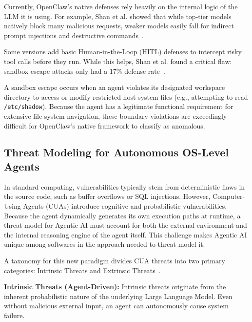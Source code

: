 \documentclass[a4paper]{report}
\begin{document}
Currently, OpenClaw's native defenses rely heavily on the internal logic of the LLM it is using. For example, Shan et al. showed that while top-tier models natively block many malicious requests, weaker models easily fall for indirect prompt injections and destructive commands~\cite{shan2025dont}.

Some versions add basic Human-in-the-Loop (HITL) defenses to intercept risky tool calls before they run. While this helps, Shan et al. found a critical flaw: sandbox escape attacks only had a 17\% defense rate~\cite{shan2025dont}.

A sandbox escape occurs when an agent violates its designated workspace directory to access or modify restricted host system files (e.g., attempting to read \texttt{/etc/shadow}). Because the agent has a legitimate functional requirement for extensive file system navigation, these boundary violations are exceedingly difficult for OpenClaw's native framework to classify as anomalous.

\subsection{Threat Modeling for Autonomous OS-Level Agents}

In standard computing, vulnerabilities typically stem from deterministic flaws in the source code, such as buffer overflows or SQL injections. However, Computer-Using Agents (CUAs) introduce cognitive and probabilistic vulnerabilities. Because the agent dynamically generates its own execution paths at runtime, a threat model for Agentic AI must account for both the external environment and the internal reasoning engine of the agent itself. This challenge makes Agentic AI unique among softwares in the approach needed to threat model it.

A taxonomy for this new paradigm divides CUA threats into two primary categories: Intrinsic Threats and Extrinsic Threats~\cite{chen2025survey}.

\textbf{Intrinsic Threats (Agent-Driven):} Intrinsic threats originate from the inherent probabilistic nature of the underlying Large Language Model. Even without malicious external input, an agent can autonomously cause system failure.
\end{document}
